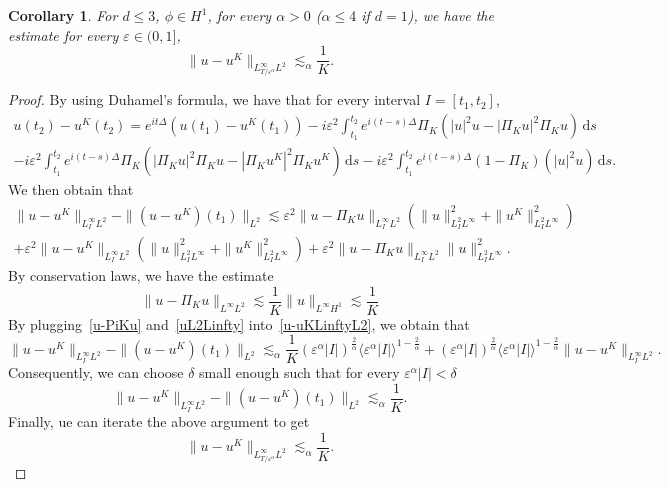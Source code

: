 \documentclass[10pt,a4paper]{article}
\newtheorem{corollary}[theorem]{Corollary}
\begin{document}
  \begin{corollary}\label{coru-uKLinftyL2}
    For \( d \leq 3 \), \( \phi \in H^1 \), for every \( \alpha > 0 \) (\( \alpha
    \leq 4 \) if \( d = 1 \)), we have the estimate for every \( \varepsilon \in
    (0,1] \),
    \begin{equation}
      \|u-u^K\|_{L^\infty_{T/\varepsilon^\alpha} L^2} \lesssim_\alpha
      \frac1K.
    \end{equation}
  \end{corollary}
  \begin{proof}
    By using Duhamel's formula, we have
    that for every interval \(I = [t_1 , t_2]\),
    \begin{multline}
      u(t_2) - u^K(t_2) = e^{it\Delta}(u(t_1) - u^K(t_1))  
      - i \varepsilon^2 \int_{t_1}^{t_2} e^{i(t-s)\Delta} \Pi_K (|u|^2u 
      - |\Pi_K u|^2\Pi_K u) \,\mathrm{d}s \\ 
      - i \varepsilon^2 \int_{t_1}^{t_2} e^{i(t-s)\Delta} \Pi_K (|\Pi_K u|^2\Pi_K u 
      - |\Pi_K u^K|^2\Pi_K u^K) \,\mathrm{d}s  
      - i \varepsilon^2 \int_{t_1}^{t_2} e^{i(t-s)\Delta} (1 - \Pi_K)(|u|^2u) 
      \,\mathrm{d}s .
    \end{multline}
    We then obtain that
    \begin{multline}\label{u-uKLinftyL2}
      \|u-u^K\|_{L^{\infty}_{I}L^2} - \|(u-u^K)(t_1)\|_{L^2} \lesssim
      \varepsilon^2 \| u - \Pi_K u \|_{L^{\infty}_{I}L^2} ( \|u\|^2_{L^2_{I}L^{\infty}} + 
      \|u^K\|^2_{L^2_{I}L^{\infty}} ) \\
      + \varepsilon^2 \| u - u^K \|_{L^{\infty}_{I}L^2} ( \|u\|^2_{L^2_{I}L^{\infty}} + 
      \|u^K\|^2_{L^2_{I}L^{\infty}} ) + \varepsilon^2 \| u - \Pi_K u \|_{L^{\infty}_{I}L^2} 
      \|u\|^2_{L^2_{I}L^{\infty}}.
    \end{multline}
    By conservation laws, we have the estimate
    \begin{equation}\label{u-PiKu}
      \|u-\Pi_K u\|_{L^\infty L^2} \lesssim \frac1K \|u\|_{L^\infty H^1}
      \lesssim \frac1K
    \end{equation}
    By plugging~\eqref{u-PiKu} and~\eqref{uL2Linfty} into~\eqref{u-uKLinftyL2},
    we obtain that
    \[ \|u-u^K\|_{L^{\infty}_{I}L^2} - \|(u-u^K)(t_1)\|_{L^2} 
    \lesssim_{\alpha} \frac1K 
    {(\varepsilon^\alpha |I|)}^\frac2\alpha {\langle\varepsilon^\alpha |I|\rangle}^{1-\frac2\alpha} + 
    {(\varepsilon^\alpha |I|)}^\frac2\alpha {\langle\varepsilon^\alpha |I|\rangle}^{1-\frac2\alpha}
    \|u-u^K\|_{L^{\infty}_{I}L^2}. \]
    Consequently, we can choose \(\delta\) small enough such that for every 
    \(\varepsilon^\alpha |I| < \delta\)
    \[ \|u-u^K\|_{L^{\infty}_{I}L^2} - \|(u-u^K)(t_1)\|_{L^2} 
    \lesssim_\alpha \frac1K. \]
    Finally, ue can iterate the above argument to get 
    \[ \|u-u^K\|_{L^\infty_{T/\varepsilon^\alpha} L^2} \lesssim_\alpha
    \frac1K.\]
  \end{proof}
\end{document}
